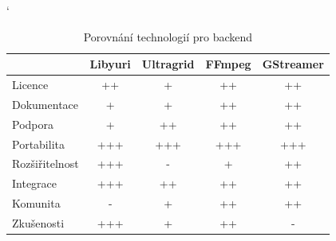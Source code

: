 \documentclass[thesis=M,czech]{FITthesis}[2012/06/26]
\begin{document}
\begin{table}[]
\catcode` %
\centering
\begin{tabular}{l|l|l|l|l|}
\cline{2-5}
\multicolumn{1}{c|}{}                & \multicolumn{1}{c|}{Libyuri} & \multicolumn{1}{c|}{Ultragrid} & \multicolumn{1}{c|}{FFmpeg} & \multicolumn{1}{c|}{GStreamer} \\ \hline
\multicolumn{1}{|l|}{Licence}        & \multicolumn{1}{c|}{++}      & \multicolumn{1}{c|}{+}         & \multicolumn{1}{c|}{++}                                     & \multicolumn{1}{c|}{++}        \\ \hline
\multicolumn{1}{|l|}{Dokumentace}    & \multicolumn{1}{c|}{+}       & \multicolumn{1}{c|}{+}         & \multicolumn{1}{c|}{++}                                      & \multicolumn{1}{c|}{++}        \\ \hline
\multicolumn{1}{|l|}{Podpora}        & \multicolumn{1}{c|}{+}       & \multicolumn{1}{c|}{++}        & \multicolumn{1}{c|}{++}                                      & \multicolumn{1}{c|}{++}        \\ \hline
\multicolumn{1}{|l|}{Portabilita}    & \multicolumn{1}{c|}{+++}     & \multicolumn{1}{c|}{+++}       & \multicolumn{1}{c|}{+++}                                    & \multicolumn{1}{c|}{+++}       \\ \hline
\multicolumn{1}{|l|}{Rozšiřitelnost} & \multicolumn{1}{c|}{+++}     & \multicolumn{1}{c|}{-}         & \multicolumn{1}{c|}{+}                                      & \multicolumn{1}{c|}{++}        \\ \hline
\multicolumn{1}{|l|}{Integrace}      & \multicolumn{1}{c|}{+++}     & \multicolumn{1}{c|}{++}        & \multicolumn{1}{c|}{++}                                     & \multicolumn{1}{c|}{++}        \\ \hline
\multicolumn{1}{|l|}{Komunita}       & \multicolumn{1}{c|}{-}       & \multicolumn{1}{c|}{+}         & \multicolumn{1}{c|}{++}                                     & \multicolumn{1}{c|}{++}        \\ \hline
\multicolumn{1}{|l|}{Zkušenosti}     & \multicolumn{1}{c|}{+++}     & \multicolumn{1}{c|}{+}         & \multicolumn{1}{c|}{++}                                     & \multicolumn{1}{c|}{-}         \\ \hline
\end{tabular}
\caption{Porovnání technologií pro backend}

\label{tbl:table_backend}
\end{table}
\end{document}
